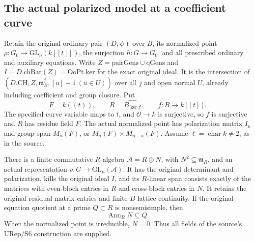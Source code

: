 \subsection{The actual polarized model at a coefficient curve}
\label{sec:selmer-polarized-model}

Retain the original ordinary pair \((D,\psi)\) over \(B\), its
normalized point \(\rho:G_0\to\mathrm{GL}_n(k[[t]])\), the
surjection \(h:G\to G_0\), and all prescribed ordinary and auxiliary
equations.  Write \(Z=\mathrm{pairGens}\cup\mathrm{qGens}\) and
\(I=D.\mathrm{chBar}(Z)=\mathrm{OoPt.ker}\) for the exact original
ideal.  It is the intersection of
\((D.\mathrm{CH},Z,\mathfrak m_B^j,[u]-1\ (u\in U))\) over all
\(j\) and open normal \(U\), already including coefficient and
group closure.  Put
\[
 F=k((t)),\qquad R=\widehat{B_{\ker f}},
 \qquad f:B\longrightarrow k[[t]].
\]
The specified curve variable maps to \(t\), and \(\mathcal O\to k\)
is surjective, so \(f\) is surjective and \(R\) has residue field
\(F\).  The actual normalized point has polarization matrix \(I_n\)
and group span \(M_n(F)\), or \(M_a(F)\times M_{n-a}(F)\).
Assume \(\ell=\operatorname{char}k\ne2\), as in the source.

\begin{proposition}
\label{prop:selmer-polarized-model}
There is a finite commutative \(R\)-algebra
\(\mathcal A=R\oplus N\), with \(N^2\subseteq\mathfrak m_R\), and
an actual representation \(v:G\to\mathrm{GL}_n(\mathcal A)\).
It has the original determinant and polarization, kills the
original ideal \(I\), and its \(R\)-linear span consists exactly
of the matrices with even-block entries in \(R\) and cross-block
entries in \(N\).  It retains the original residual matrix entries
and finite-\(B\)-lattice continuity.  If the original equation
quotient at a prime \(Q\subset R\) is nonsemisimple, then
\[
                         \operatorname{Ann}_R N\subseteq Q.
\]
When the normalized point is irreducible, \(N=0\).
Thus all fields of the source's \(\mathrm{URep}/\mathrm{S6}\)
construction are supplied.
\end{proposition}


